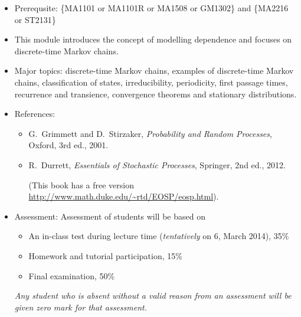 \documentclass[a4paper]{article}
\begin{document}
\begin{itemize}
\item Prerequsite: \{MA1101 or MA1101R or MA1508 or GM1302\} and \{MA2216 or ST2131\}
  
\item
  This module introduces the concept of modelling dependence and focuses on discrete-time Markov chains. 
  
\item
  Major topics: discrete-time Markov chains, examples of discrete-time Markov chains, classification of states, irreducibility, periodicity, first passage times, recurrence and transience, convergence theorems and stationary distributions. 

\item References:
  \begin{itemize}
  \item
    G.~Grimmett and D.~Stirzaker, \emph{Probability and Random Processes}, Oxford, 3rd ed., 2001.
 
  \item
    R.~Durrett, \emph{Essentials of Stochastic Processes}, Springer, 2nd ed., 2012.

    (This book has a free version \url{http://www.math.duke.edu/~rtd/EOSP/eosp.html}).
  \end{itemize}
\item Assessment:
  Assessment of students will be based on
  \begin{itemize}
  \item An in-class test during lecture time (\emph{tentatively} on 6, March 2014), 35\%
  \item Homework and tutorial participation, 15\%
  \item Final examination, 50\%
  \end{itemize}
  \emph{Any student who is absent without a valid reason from an assessment will be given zero mark for that assessment.}
\end{itemize}
\end{document}
